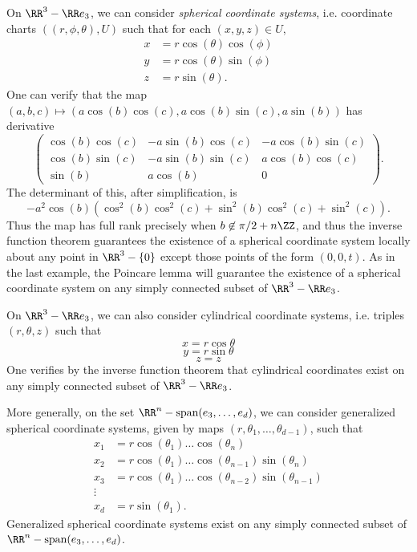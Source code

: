 \begin{example}
    On $\RR^3 - \RR e_3$, we can consider \emph{spherical coordinate systems}, i.e. coordinate charts $((r,\phi,\theta), U)$ such that for each $(x,y,z) \in U$,
    \begin{align*}
        x &= r \cos(\theta) \cos(\phi)\\
        y &= r \cos(\theta) \sin(\phi)\\
        z &= r \sin(\theta).
    \end{align*}
    One can verify that the map $(a,b,c) \mapsto (a \cos(b) \cos(c), a \cos(b) \sin(c), a \sin(b))$ has derivative
    \[ \begin{pmatrix} \cos(b) \cos(c) & -a \sin(b) \cos(c) & - a \cos(b) \sin(c) \\ \cos(b) \sin(c) & - a \sin(b) \sin(c) & a \cos(b) \cos(c) \\ \sin(b) & a \cos(b) & 0 \end{pmatrix}. \]
    The determinant of this, after simplification, is
    \[ -a^2 \cos(b) (\cos^2(b) \cos^2(c) + \sin^2(b) \cos^2(c) + \sin^2(c)). \]
    Thus the map has full rank precisely when $b \not \in \pi/2 + n \ZZ$, and thus the inverse function theorem guarantees the existence of a spherical coordinate system locally about any point in $\RR^3 - \{ 0 \}$ except those points of the form $(0,0,t)$. As in the last example, the Poincare lemma will guarantee the existence of a spherical coordinate system on any simply connected subset of $\RR^3 - \RR e_3$.
\end{example}

\begin{example}
    On $\RR^3 - \RR e_3$, we can also consider cylindrical coordinate systems, i.e. triples $(r,\theta,z)$ such that
    \[ x = r \cos \theta \]
    \[ y = r \sin \theta \]
    \[ z = z \]
    One verifies by the inverse function theorem that cylindrical coordinates exist on any simply connected subset of $\RR^3 - \RR e_3$.
\end{example}

\begin{example}
    More generally, on the set $\RR^n - \text{span}(e_3, \dots, e_d)$, we can consider generalized spherical coordinate systems, given by maps $(r,\theta_1, \dots, \theta_{d-1})$, such that
    \begin{align*}
        x_1 &= r \cos(\theta_1) \dots \cos(\theta_n)\\
        x_2 &= r \cos(\theta_1) \dots \cos(\theta_{n-1}) \sin(\theta_n)\\
        x_3 &= r \cos(\theta_1) \dots \cos(\theta_{n-2}) \sin(\theta_{n-1})\\
        \vdots\\
        x_d &= r \sin(\theta_1).
    \end{align*}
    Generalized spherical coordinate systems exist on any simply connected subset of $\RR^n - \text{span}(e_3, \dots, e_d)$.
\end{example} 

